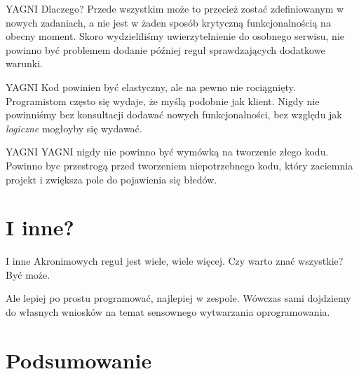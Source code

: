 \begin{frame}{YAGNI}		
	Dlaczego? Przede wszystkim może to przecież zostać zdefiniowanym w nowych zadaniach, a nie jest w żaden sposób krytyczną funkcjonalnością na obecny moment. Skoro wydzieliliśmy uwierzytelnienie do osobnego serwisu, nie powinno być problemem dodanie później reguł sprawdzających dodatkowe warunki.
\end{frame}

\begin{frame}{YAGNI}		
	Kod powinien być elastyczny, ale na pewno nie rociągnięty. Programistom często się wydaje, że myślą podobnie jak klient. Nigdy nie powinniśmy bez konsultacji dodawać nowych funkcjonalności, bez względu jak \emph{logiczne} mogłoyby się wydawać.
\end{frame}

\begin{frame}{YAGNI}		
	YAGNI nigdy nie powinno być wymówką na tworzenie złego kodu. Powinno byc przestrogą przed tworzeniem niepotrzebnego kodu, który zaciemnia projekt i zwiększa pole do pojawienia się błedów.
\end{frame}

\section{I inne?}

\begin{frame}{I inne}		
	Akronimowych reguł jest wiele, wiele więcej. Czy warto znać wszystkie? Być może.
	
	Ale lepiej po prostu programować, najlepiej w zespole. Wówczas sami dojdziemy do własnych wniosków na temat sensownego wytwarzania oprogramowania.
\end{frame}

\section{Podsumowanie}

